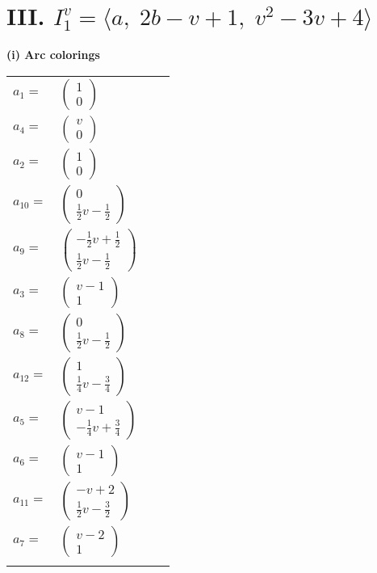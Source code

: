 \documentclass[1p]{elsarticle_modified}
\theoremstyle{definition}
\begin{document}
\centering \section*{III. $I^v_{1}= \langle a,\;2 b- v+1,\;v^2-3 v+4 \rangle$}
\flushleft \textbf{(i) Arc colorings}\\
\begin{tabular}{m{7pt} m{180pt} m{7pt} m{180pt} }
\flushright $a_{1}=$&$\begin{pmatrix}1\\0\end{pmatrix}$ \\
\flushright $a_{4}=$&$\begin{pmatrix}v\\0\end{pmatrix}$ \\
\flushright $a_{2}=$&$\begin{pmatrix}1\\0\end{pmatrix}$ \\
\flushright $a_{10}=$&$\begin{pmatrix}0\\\frac{1}{2} v-\frac{1}{2}\end{pmatrix}$ \\
\flushright $a_{9}=$&$\begin{pmatrix}-\frac{1}{2} v+\frac{1}{2}\\\frac{1}{2} v-\frac{1}{2}\end{pmatrix}$ \\
\flushright $a_{3}=$&$\begin{pmatrix}v-1\\1\end{pmatrix}$ \\
\flushright $a_{8}=$&$\begin{pmatrix}0\\\frac{1}{2} v-\frac{1}{2}\end{pmatrix}$ \\
\flushright $a_{12}=$&$\begin{pmatrix}1\\\frac{1}{4} v-\frac{3}{4}\end{pmatrix}$ \\
\flushright $a_{5}=$&$\begin{pmatrix}v-1\\-\frac{1}{4} v+\frac{3}{4}\end{pmatrix}$ \\
\flushright $a_{6}=$&$\begin{pmatrix}v-1\\1\end{pmatrix}$ \\
\flushright $a_{11}=$&$\begin{pmatrix}- v+2\\\frac{1}{2} v-\frac{3}{2}\end{pmatrix}$ \\
\flushright $a_{7}=$&$\begin{pmatrix}v-2\\1\end{pmatrix}$\\&\end{tabular}
\end{document}
